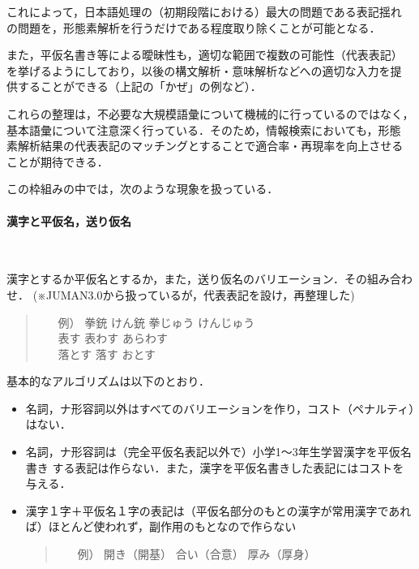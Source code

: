 \documentclass[a4j,titlepage]{jarticle}
\begin{document}
これによって，日本語処理の（初期段階における）最大の問題である表記揺れ
の問題を，形態素解析を行うだけである程度取り除くことが可能となる．

また，平仮名書き等による曖昧性も，適切な範囲で複数の可能性（代表表記）
を挙げるようにしており，以後の構文解析・意味解析などへの適切な入力を提
供することができる（上記の「かぜ」の例など）．

これらの整理は，不必要な大規模語彙について機械的に行っているのではなく，
基本語彙について注意深く行っている．そのため，情報検索においても，形態
素解析結果の代表表記のマッチングとすることで適合率・再現率を向上させる
ことが期待できる．


この枠組みの中では，次のような現象を扱っている．

\paragraph{漢字と平仮名，送り仮名} \ 

漢字とするか平仮名とするか，また，送り仮名のバリエーション．その組み合わせ．
(※JUMAN3.0から扱っているが，代表表記を設け，再整理した)  
       \begin{quote}
	\begin{itemize}
	 \item[例）] 拳銃 けん銃 拳じゅう けんじゅう \\
		   表す 表わす あらわす \\
		   落とす 落す おとす
	\end{itemize}
       \end{quote}

基本的なアルゴリズムは以下のとおり．
\begin{itemize}
 \item 名詞，ナ形容詞以外はすべてのバリエーションを作り，コスト（ペナルティ）はない．
 \item 名詞，ナ形容詞は（完全平仮名表記以外で）小学1〜3年生学習漢字を平仮名書き
  する表記は作らない．また，漢字を平仮名書きした表記にはコストを与える．
 \item 漢字１字＋平仮名１字の表記は（平仮名部分のもとの漢字が常用漢字であれ
  ば）ほとんど使われず，副作用のもとなので作らない
       \begin{quote}
	\begin{itemize}
	 \item[例）] 開き（開基） 合い（合意） 厚み（厚身）
	\end{itemize}
       \end{quote}
\end{itemize}
\end{document}
